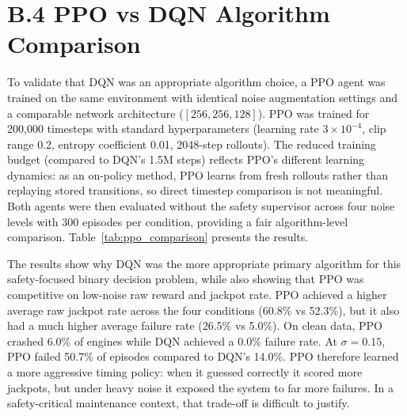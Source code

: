 \documentclass[12pt,a4paper]{report}
\begin{document}
\section*{B.4 PPO vs DQN Algorithm Comparison}
\label{sec:ppo_comparison}

To validate that DQN was an appropriate algorithm choice, a PPO agent was trained on the same environment with identical noise augmentation settings and a comparable network architecture ($[256, 256, 128]$). PPO was trained for 200,000 timesteps with standard hyperparameters (learning rate $3 \times 10^{-4}$, clip range 0.2, entropy coefficient 0.01, 2048-step rollouts). The reduced training budget (compared to DQN's 1.5M steps) reflects PPO's different learning dynamics: as an on-policy method, PPO learns from fresh rollouts rather than replaying stored transitions, so direct timestep comparison is not meaningful. Both agents were then evaluated without the safety supervisor across four noise levels with 300 episodes per condition, providing a fair algorithm-level comparison. Table~\ref{tab:ppo_comparison} presents the results.

\begin{table}[h]
\centering
\small
\caption{DQN vs PPO algorithm comparison (uncertainty-aware, no safety supervisor, 300 episodes per condition).}
\label{tab:ppo_comparison}
\renewcommand{\arraystretch}{1.2}
\setlength{\tabcolsep}{4pt}
\end{table}

The results show why DQN was the more appropriate primary algorithm for this safety-focused binary decision problem, while also showing that PPO was competitive on low-noise raw reward and jackpot rate. PPO achieved a higher average raw jackpot rate across the four conditions (60.8\% vs 52.3\%), but it also had a much higher average failure rate (26.5\% vs 5.0\%). On clean data, PPO crashed 6.0\% of engines while DQN achieved a 0.0\% failure rate. At $\sigma = 0.15$, PPO failed 50.7\% of episodes compared to DQN's 14.0\%. PPO therefore learned a more aggressive timing policy: when it guessed correctly it scored more jackpots, but under heavy noise it exposed the system to far more failures. In a safety-critical maintenance context, that trade-off is difficult to justify.
\end{document}
